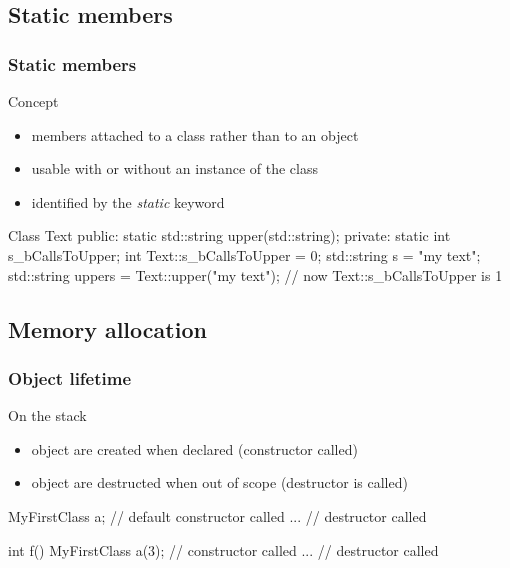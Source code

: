 \subsection{Static members}

\begin{frame}[fragile,label=current]
  \frametitle{Static members}
  \begin{block}{Concept}
    \begin{itemize}
    \item members attached to a class rather than to an object
    \item usable with or without an instance of the class
    \item identified by the {\it static} keyword
    \end{itemize}
  \end{block}
  \begin{cppcode}
    Class Text {
    public:
      static std::string upper(std::string);
    private:
      static int s_bCallsToUpper;
    }
    int Text::s_bCallsToUpper = 0;
    std::string s = "my text";
    std::string uppers = Text::upper("my text");
    // now Text::s_bCallsToUpper is 1
  \end{cppcode}
\end{frame}


\subsection{Memory allocation}

\begin{frame}[fragile]
  \frametitle{Object lifetime}
  \begin{block}{On the stack}
    \begin{itemize}
    \item object are created when declared (constructor called)
    \item object are destructed when out of scope (destructor is called)
    \end{itemize}
  \end{block}
  \begin{cppcode}
    {
      MyFirstClass a; // default constructor called
      ...
    }  // destructor called

    int f() {
      MyFirstClass a(3); // constructor called
      ...
    } // destructor called
  \end{cppcode}
\end{frame}

